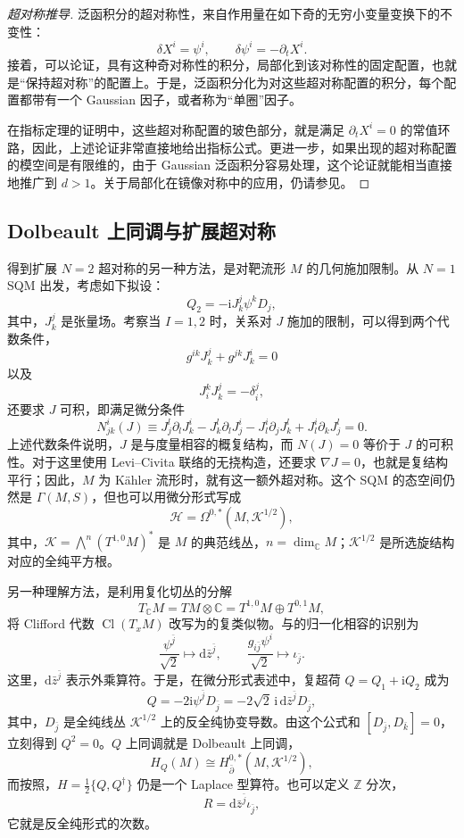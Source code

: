 \begin{proof}[超对称推导]
泛函积分的超对称性，来自作用量在如下奇的无穷小变量变换下的不变性：
\[
\delta X^i=\psi^i,\qquad\delta\psi^i=-\partial_tX^i.
\]
接着，可以论证，具有这种奇对称性的积分，局部化到该对称性的固定配置，也就是“保持超对称”的配置上。于是，泛函积分化为对这些超对称配置的积分，每个配置都带有一个 Gaussian 因子，或者称为“单圈”因子。

在指标定理的证明中，这些超对称配置的玻色部分，就是满足 $\partial_tX^i=0$ 的常值环路，因此，上述论证非常直接地给出指标公式。更进一步，如果出现的超对称配置的模空间是有限维的，由于 Gaussian 泛函积分容易处理，这个论证就能相当直接地推广到 $d>1$。关于局部化在镜像对称中的应用，仍请参见。
\end{proof}

\subsection{Dolbeault 上同调与扩展超对称}\label{sec:3.1.4}

得到扩展 $N=2$ 超对称的另一种方法，是对靶流形 $M$ 的几何施加限制。从 $N=1$ SQM 出发，考虑如下拟设：
\[
Q_2=-\mathrm{i}J^j_k\psi^kD_j,
\]
其中，$J^j_k$ 是张量场。考察当 $I=1,2$ 时，关系对 $J$ 施加的限制，可以得到两个代数条件，
\[
g^{ik}J^j_k+g^{jk}J^i_k=0
\]
以及
\[
J^k_iJ^j_k=-\delta^j_i,
\]
还要求 $J$ 可积，即满足微分条件
\[
N^i_{jk}(J)\equiv
J^l_j\partial_lJ^i_k-J^l_k\partial_lJ^i_j
-J^i_l\partial_jJ^l_k+J^i_l\partial_kJ^l_j=0.
\]
上述代数条件说明，$J$ 是与度量相容的概复结构，而 $N(J)=0$ 等价于 $J$ 的可积性。对于这里使用 Levi--Civita 联络的无挠构造，还要求 $\nabla J=0$，也就是复结构平行；因此，$M$ 为 Kähler 流形时，就有这一额外超对称。这个 SQM 的态空间仍然是 $\Gamma(M,S)$，但也可以用微分形式写成
\[
\mathcal{H}=\Omega^{0,*}(M,\mathcal{K}^{1/2}),
\]
其中，$\mathcal{K}=\bigwedge^n(T^{1,0}M)^*$ 是 $M$ 的典范线丛，$n=\dim_\mathbb{C}M$；$\mathcal{K}^{1/2}$ 是所选旋结构对应的全纯平方根。

另一种理解方法，是利用复化切丛的分解
\[
T_\mathbb{C}M=TM\otimes\mathbb{C}=T^{1,0}M\oplus T^{0,1}M,
\]
将 Clifford 代数 $\operatorname{Cl}(T_xM)$ 改写为的复类似物。与的归一化相容的识别为
\[
\frac{\psi^{\bar j}}{\sqrt2}\longmapsto\mathrm{d}\bar z^{\bar j},
\qquad
\frac{g_{i\bar j}\psi^i}{\sqrt2}\longmapsto\iota_{\bar j}.
\]
这里，$\mathrm{d}\bar z^{\bar j}$ 表示外乘算符。于是，在微分形式表述中，复超荷 $Q=Q_1+\mathrm{i}Q_2$ 成为
\[
Q=-2\mathrm{i}\psi^{\bar j}D_{\bar j}
=-2\sqrt2\,\mathrm{i}\,\mathrm{d}\bar z^{\bar j}D_{\bar j},
\]
其中，$D_{\bar j}$ 是全纯线丛 $\mathcal{K}^{1/2}$ 上的反全纯协变导数。由这个公式和 $[D_{\bar j},D_{\bar k}]=0$，立刻得到 $Q^2=0$。$Q$ 上同调就是 Dolbeault 上同调，
\[
H_Q(M)\cong H^{0,*}_{\bar\partial}(M,\mathcal{K}^{1/2}),
\]
而按照，$H=\tfrac12\{Q,Q^\dagger\}$ 仍是一个 Laplace 型算符。也可以定义 $\mathbb{Z}$ 分次，
\begin{equation}\label{eq:3.19}
R=\mathrm{d}\bar z^{\bar j}\iota_{\bar j},
\end{equation}
它就是反全纯形式的次数。

